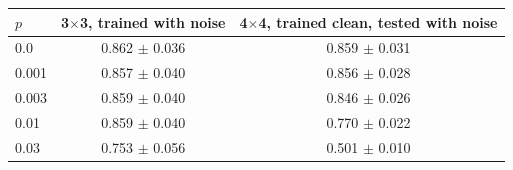 \begin{tabular}{lcc}
\toprule
$p$ & 3$\times$3, trained with noise & 4$\times$4, trained clean, tested with noise \\
\midrule
0.0 & 0.862 $\pm$ 0.036 & 0.859 $\pm$ 0.031 \\
0.001 & 0.857 $\pm$ 0.040 & 0.856 $\pm$ 0.028 \\
0.003 & 0.859 $\pm$ 0.040 & 0.846 $\pm$ 0.026 \\
0.01 & 0.859 $\pm$ 0.040 & 0.770 $\pm$ 0.022 \\
0.03 & 0.753 $\pm$ 0.056 & 0.501 $\pm$ 0.010 \\
\bottomrule
\end{tabular}
